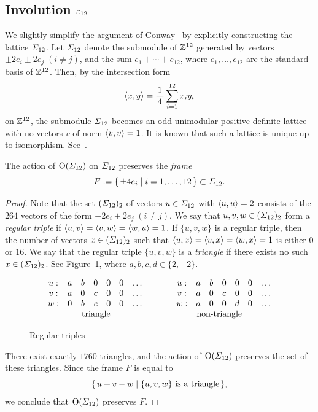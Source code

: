 \documentclass{amsart} %
\begin{document}
\subsection{Involution $\varepsilon_{12}$}\label{subsec:vep12}
%
We slightly simplify the argument of Conway~\cite[Chapter~10, Section~3.7]{theCSbook} 
by explicitly constructing the lattice $\varSigma_{12}$.
Let $\varSigma_{12}$ denote the submodule of $\mathord{\mathbb{Z}}^{12}$ generated by vectors 
$\pm 2 e_i\pm 2 e_j\; (i\ne j)$, 
and the sum $e_1+\cdots+e_{12}$,
where $e_1,\dots, e_{12}$ are the standard basis of $\mathord{\mathbb{Z}}^{12}$.
Then, by the intersection form 
\[
\langle x, y \rangle=\frac{1}{\,4\,} \sum_{i=1}^{12} x_i y_i
\]
on $\mathord{\mathbb{Z}}^{12}$, the submodule $\varSigma_{12}$ becomes an odd unimodular
positive-definite lattice with no vectors $v$ of norm $\langle v, v \rangle=1$.
It is known that such a lattice is unique up to isomorphism. 
See~\cite[Table 16.7]{theCSbook}.
%
\begin{lemma}\label{lem:frame}
The action of $\mathord{\mathrm{O}}(\varSigma_{12})$ on $\varSigma_{12}$ preserves
the \emph{frame}
\[
F:=\{\,{\pm 4 e_i}\mid {i=1, \dots, 12} \,\}\subset \varSigma_{12}.
\]
\end{lemma}
%
\begin{proof}
Note that the set $(\varSigma_{12})_2$ of vectors $u\in \varSigma_{12}$ with $\langle u, u \rangle=2$
consists of the $264$ vectors of the form $\pm 2 e_i\pm 2 e_j\; (i\ne j)$.
We say that $u, v, w\in( \varSigma_{12})_2$ form a \emph{regular triple} if 
$\langle u, v \rangle=\langle v, w \rangle=\langle w, u \rangle=1$.
If $\{u, v, w\}$ is a regular triple, then the number of 
vectors $x\in( \varSigma_{12})_2$ such that 
$\langle u, x \rangle=\langle v, x \rangle=\langle w, x \rangle=1$
is either $0$ or $16$.
We say that the regular triple $\{u, v, w\}$ is a \emph{triangle} if there exists no such $x\in (\varSigma_{12})_2$.
See Figure~\ref{fig:triangle},
where $a, b, c , d\in \{2, -2\}$.
%
\begin{figure}
{\small
\[
\begin{array}{ccccccc}
u: & a& b & 0 & 0 & 0 &\dots\\
v: &a&0 & c & 0 & 0 &\dots\\
w: & 0& b & c & 0 & 0 & \dots\\
& \rlap{\textrm{\;\;\;\;\;triangle}} && &
\end{array}
\qquad\quad
\begin{array}{ccccccc}
u: &a& b & 0 & 0 & 0 &\dots\\
v: &a&0 & c & 0 & 0 & \dots\\
w: &a& 0 & 0 & d & 0 & \dots\\
\rlap{ \textrm{\;\;\;\;\;non-triangle}} && & &
\end{array}
\]
}
\vskip -1mm
\caption{Regular triples}\label{fig:triangle}
\end{figure}
%
There exist exactly $1760$ triangles, and 
the action of $\mathord{\mathrm{O}}(\varSigma_{12})$ preserves the set of these triangles.
Since 
 the frame $F$ is equal to
\[
\{\,{u+v-w}\mid {\textrm{$\{u, v, w\}$ is a triangle}} \,\},
\]
we conclude that $\mathord{\mathrm{O}}(\varSigma_{12})$ preserves $F$.
\end{proof}
\end{document}
